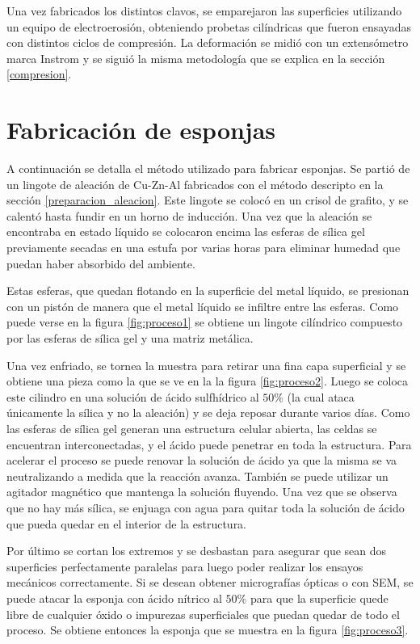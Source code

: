 \documentclass[a4paper,12pt,fleqn,twoside,openany]{book}
\begin{document}
    
    Una vez fabricados los distintos clavos, se emparejaron las superficies utilizando un equipo de electroerosión, obteniendo probetas cilíndricas que fueron ensayadas con distintos ciclos de compresión. La deformación se midió con un extensómetro marca Instrom y se siguió la misma metodología que se explica en la sección \ref{compresion}.
    

\section{Fabricación de esponjas} \label{FabricacionEsponjas}

A continuación se detalla el método utilizado para fabricar esponjas. Se partió de un lingote de aleación de Cu-Zn-Al fabricados con el método descripto en la sección \ref{preparacion_aleacion}. Este lingote se colocó en un crisol de grafito, y se calentó hasta fundir en un horno de inducción. Una vez que la aleación se encontraba en estado líquido se colocaron encima las esferas de sílica gel previamente secadas en una estufa por varias horas para eliminar humedad que puedan haber absorbido del ambiente.

Estas esferas, que quedan flotando en la superficie del metal líquido, se presionan con un pistón de manera que el metal líquido se infiltre entre las esferas. Como puede verse en la figura \ref{fig:proceso1} se obtiene un lingote cilíndrico compuesto por las esferas de sílica gel y una matriz metálica.

Una vez enfriado, se tornea la muestra para retirar una fina capa superficial y se obtiene una pieza como la que se ve en la la figura \ref{fig:proceso2}. Luego se coloca este cilindro en una solución de ácido sulfhídrico al $50\%$ (la cual ataca únicamente la sílica y no la aleación) y se deja reposar durante varios días. Como las esferas de sílica gel generan una estructura celular abierta, las celdas se encuentran interconectadas, y el ácido puede penetrar en toda la estructura.  Para acelerar el proceso se puede renovar la solución de ácido ya que la misma se va neutralizando a medida que la reacción avanza. También se puede utilizar un agitador magnético que mantenga la solución fluyendo. Una vez que se observa que no hay más sílica, se enjuaga con agua para quitar toda la solución de ácido que pueda quedar en el interior de la estructura.

Por último se cortan los extremos y se desbastan para asegurar que sean dos superficies perfectamente paralelas para luego poder realizar los
ensayos mecánicos correctamente. Si se desean obtener micrografías ópticas o con SEM, se puede atacar  la esponja con ácido nítrico al $50\%$ para que la superficie quede libre de cualquier óxido o impurezas superficiales que puedan quedar de todo el proceso. Se obtiene entonces la esponja que se muestra en la figura \ref{fig:proceso3}.
\end{document}
